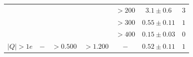 \begin{table}
\begin{center}
\begin{tabular}{|l|c|c|c|c|cc|}
                        &                         &                            &                            & $> 200$   & $3.1\pm0.6$    & $3$  \\
                        &                         &                            &                            & $> 300$   & $0.55\pm0.11$  & $1$  \\
                        &                         &                            &                            & $> 400$   & $0.15\pm0.03$  & $0$ \\ \hline
$|Q|>1e$                &           $-$           &       $> 0.500$            &        $> 1.200 $          &    $-$    & $0.52\pm 0.11$ & $1$ \\ \hline

 \end{tabular}
 \end{center}
\end{table}

